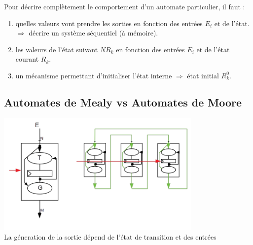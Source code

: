 Pour décrire complètement le comportement d'un automate particulier, il faut :
\begin{enumerate}
  \item quelles valeurs vont prendre les sorties en fonction des entrées $E_i$ et
  de l'état. $\Rightarrow$ décrire un système séquentiel (à mémoire).
  \item les valeurs de l'état suivant $NR_k$ en fonction des entrées $E_i$ et de
  l'état courant $R_k$.
  \item un mécanisme permettant d'initialiser l'état interne $\Rightarrow$ état
  initial $R_k^{0}$.
\end{enumerate}

\subsection{Automates de Mealy vs Automates de Moore}

\begin{center}
  \includegraphics[height=6cm]{cours1/pics/mealy.png}
  \\La géneration de la sortie dépend de l'état de transition et des entrées
\end{center}


